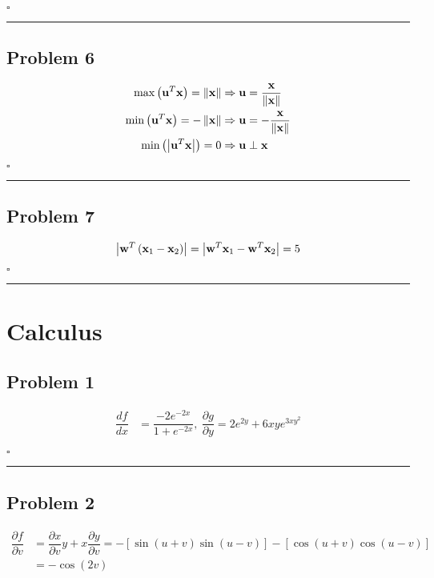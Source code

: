 \documentclass[12pt]{article}
\newcommand*{\QEDB}{\hfill\ensuremath{\square}}
\newcommand{\SBrackets}[1]{\left[#1\right]}
\newcommand{\ParTh}[1]{\left(#1\right)}
\newcommand{\BF}[1]{{\bf#1}}
\newcommand{\AbsVal}[1]{\left|#1\right|}
\newcommand{\VecAbsVal}[1]{\left\|#1\right\|}
\newcommand{\horrule}[1]{\rule{\linewidth}{#1}}
\begin{document}
\QEDB

\horrule{0.5pt}

\subsection*{Problem 6}

\begin{align}
\max\ParTh{\BF{u}^T\BF{x}}=\VecAbsVal{\BF{x}}&\Rightarrow\BF{u}=\dfrac{\BF{x}}{\VecAbsVal{\BF{x}}}\\
\min\ParTh{\BF{u}^T\BF{x}}=-\VecAbsVal{\BF{x}}&\Rightarrow\BF{u}=-\dfrac{\BF{x}}{\VecAbsVal{\BF{x}}}\\
\min\ParTh{\AbsVal{\BF{u}^T\BF{x}}}=0&\Rightarrow\BF{u}\perp\BF{x}
\end{align}

\QEDB

\horrule{0.5pt}

\subsection*{Problem 7}

\begin{align}
\AbsVal{\BF{w}^T\ParTh{\BF{x}_1-\BF{x}_2}}=\AbsVal{\BF{w}^T\BF{x}_1-\BF{w}^T\BF{x}_2}=5
\end{align}

\QEDB

\horrule{0.5pt}

\section{Calculus}

\subsection*{Problem 1}

\begin{align}
\dfrac{df}{dx}&=\dfrac{-2e^{-2x}}{1+e^{-2x}},~\dfrac{\partial g}{\partial y}=2e^{2y}+6xye^{3xy^2}
\end{align}

\QEDB

\horrule{0.5pt}

\subsection*{Problem 2}

\begin{align}
\dfrac{\partial f}{\partial v}&=\dfrac{\partial x}{\partial v}y+x\dfrac{\partial y}{\partial v}=-\SBrackets{\sin\ParTh{u+v}\sin\ParTh{u-v}}-\SBrackets{\cos\ParTh{u+v}\cos\ParTh{u-v}}\\
&=-\cos\ParTh{2v}
\end{align}
\end{document}
